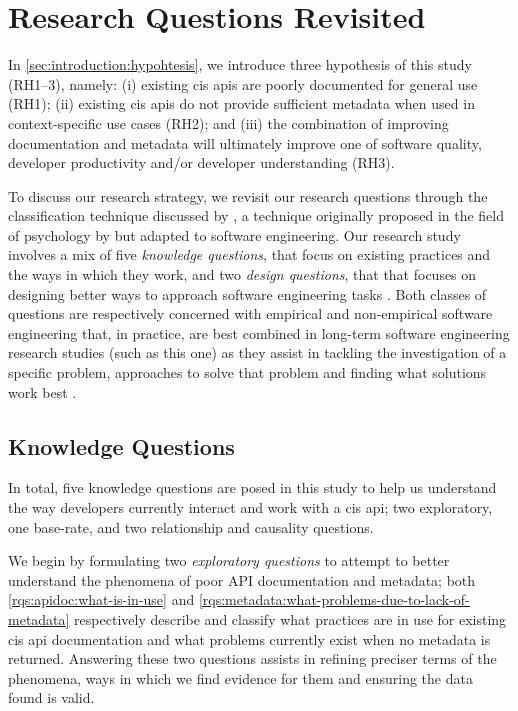 \section{Research Questions Revisited}
\label{sec:research-strategy:research-questions}

In \cref{sec:introduction:hypohtesis}, we introduce three hypothesis of this study (RH1--3), namely: (i) existing \gls{cis} \glspl{api} are poorly documented for general use (RH1); (ii) existing \gls{cis} \glspl{api} do not provide sufficient metadata when used in context-specific use cases (RH2); and (iii) the combination of improving documentation and metadata will ultimately improve one of software quality, developer productivity and/or developer understanding (RH3).

To discuss our research strategy, we revisit our research questions through the classification technique discussed by \citet{Easterbrook:2007ws}, a technique originally proposed in the field of psychology by \citet{Meltzoff:1998wg} but adapted to software engineering. Our research study involves a mix of five \textit{knowledge questions}, that focus on existing practices and the ways in which they work, and two \textit{design questions}, that that focuses on designing better ways to approach software engineering tasks \citep{Simon:1996uw}. Both classes of questions are respectively concerned with empirical and non-empirical software engineering that, in practice, are best combined in long-term software engineering research studies (such as this one) as they assist in tackling the investigation of a specific problem, approaches to solve that problem and finding what solutions work best \citep{Wieringa:2006vd}.

\subsection{Knowledge Questions}
In total, five knowledge questions are posed in this study to help us understand the way developers currently interact and work with a \gls{cis} \gls{api}; two exploratory, one base-rate, and two relationship and causality questions.

We begin by formulating two \textit{exploratory questions} to attempt to better understand the phenomena of poor API documentation and metadata; both \ref{rqs:apidoc:what-is-in-use} and \ref{rqs:metadata:what-problems-due-to-lack-of-metadata} respectively describe and classify what practices are in use for existing \gls{cis} \gls{api} documentation and what problems currently exist when no metadata is returned. Answering these two questions assists in refining preciser terms of the phenomena, ways in which we find evidence for them and ensuring the data found is valid.

